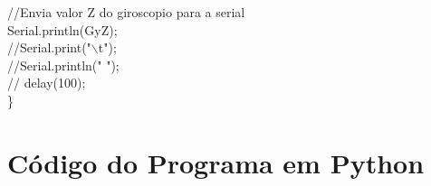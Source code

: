 \begin{anexosenv}
	//Envia valor Z do giroscopio para a serial\\ 
	Serial.println(GyZ);\\
	//Serial.print("$\backslash$t");\\
	//Serial.println(" ");\\
	// delay(100);\\
	
\}\\

\chapter{Código do Programa em Python}


%
\end{anexosenv}

